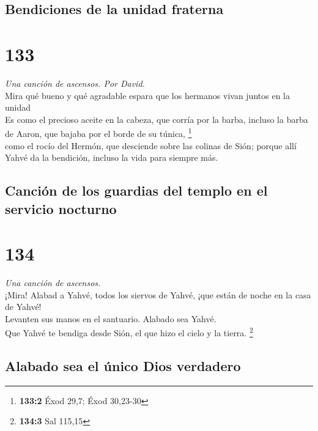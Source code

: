 \hypertarget{bendiciones-de-la-unidad-fraterna}{%
\subsection{Bendiciones de la unidad
fraterna}\label{bendiciones-de-la-unidad-fraterna}}

\hypertarget{section-130}{%
\section{133}\label{section-130}}

\emph{Una canción de ascensos. Por David.}\\
 Mira qué bueno y qué agradable espara que los hermanos
vivan juntos en la unidad\\
 Es como el precioso aceite en la cabeza, que corría por
la barba, incluso la barba de Aaron, que bajaba por el borde de su
túnica, \footnote{\textbf{133:2} Éxod 29,7; Éxod 30,23-30}\\
 como el rocío del Hermón, que desciende sobre las colinas
de Sión; porque allí Yahvé da la bendición, incluso la vida para siempre
más.

\hypertarget{canciuxf3n-de-los-guardias-del-templo-en-el-servicio-nocturno}{%
\subsection{Canción de los guardias del templo en el servicio
nocturno}\label{canciuxf3n-de-los-guardias-del-templo-en-el-servicio-nocturno}}

\hypertarget{section-131}{%
\section{134}\label{section-131}}

\emph{Una canción de ascensos.}\\
 ¡Mira! Alabad a Yahvé, todos los siervos de Yahvé, ¡que
están de noche en la casa de Yahvé!\\
 Levanten sus manos en el santuario. Alabado sea Yahvé.\\
 Que Yahvé te bendiga desde Sión, el que hizo el cielo y
la tierra. \footnote{\textbf{134:3} Sal 115,15}

\hypertarget{alabado-sea-el-uxfanico-dios-verdadero}{%
\subsection{Alabado sea el único Dios
verdadero}\label{alabado-sea-el-uxfanico-dios-verdadero}}

